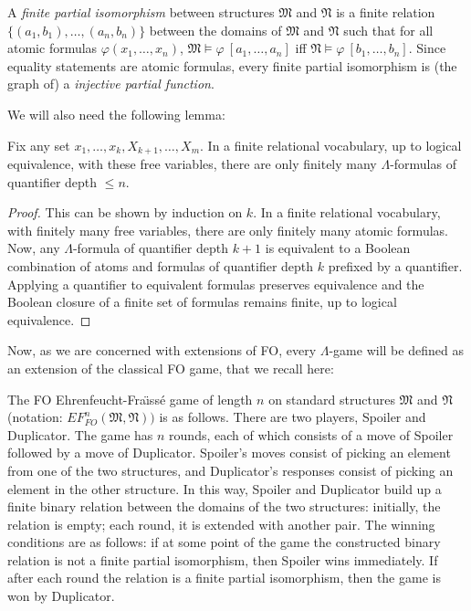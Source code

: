 \documentclass{LMCS}
\newcommand{\frM}{\mathfrak{M}}
\newcommand{\frN}{\mathfrak{N}}
\newcommand{\fo}{\textsf{FO}\xspace}
\begin{document}
\begin{defi}
A \emph{finite partial isomorphism} between structures $\frM$ and
$\frN$ is a finite relation $\{(a_1,b_1),\ldots,(a_n,b_n)\}$
between the domains of $\frM$ and $\frN$ such that for all atomic
formulas $\varphi(x_1, \ldots, x_n)$, $\frM\models\varphi~[a_1,
\ldots, a_n]$ iff $\frN\models\varphi~[b_1, \ldots, b_n]$. Since
equality statements are atomic formulas, every finite partial
isomorphism is (the graph of) a \emph{injective partial function}.
\end{defi}

We will also need the following lemma:

\begin{lem}
Fix any set $x_1, \ldots, x_k, X_{k+1}, \ldots, X_m$. In a finite
relational vocabulary, up to logical equivalence, with these free
variables, there are only finitely many $\Lambda$-formulas of quantifier depth $\leq n$.
\label{finitenesslemma}
\end{lem}

\begin{proof}
This can be shown by induction on $k$. In a finite relational vocabulary, with finitely many free variables, there are only finitely many atomic formulas. Now, any $\Lambda$-formula of quantifier depth $k+1$ is equivalent to a Boolean combination of atoms and formulas of quantifier depth $k$ prefixed by a quantifier. Applying a quantifier to equivalent formulas preserves equivalence and the Boolean closure of a finite set of formulas remains finite, up to logical equivalence.
\end{proof}

Now, as we are concerned with extensions of \fo, every $\Lambda$-game will be defined as an extension of the classical \fo game, that we recall here:

\begin{defi}[\fo Ehrenfeucht-Fra\"\i ss\'e Game]
The \fo Ehrenfeucht-Fra\"\i ss\'e game of length $n$ on standard structures $\frM$ and $\frN$ (notation: ${EF_{FO}^n}(\frM,\frN))$ is as follows.
There are two players, Spoiler and Duplicator. The game has $n$ rounds, each of which consists of a move of Spoiler followed by a move of
Duplicator. Spoiler's moves consist of picking an element from one of the two structures, and Duplicator's responses consist of picking an element
in the other structure. In this way, Spoiler and Duplicator build up a finite binary relation between the domains of the two structures: initially, the
relation is empty; each round, it is extended with another pair. The winning conditions are as follows: if at some point of the game the
constructed binary relation is not a finite partial isomorphism, then Spoiler wins immediately. If after each round the relation is a finite
partial isomorphism, then the game is won by Duplicator.
\end{defi}
\end{document}

